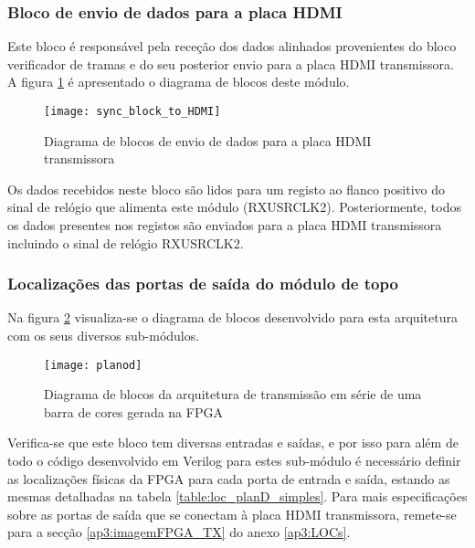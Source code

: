 \subsubsection*{Bloco de envio de dados para a placa HDMI} \label{subsub:serial_send signals to HDMI}

Este bloco é responsável pela receção dos dados alinhados provenientes do bloco verificador de tramas e do seu posterior envio para a placa HDMI transmissora. A figura \ref{fig:sync_block_to_HDMI} é apresentado o diagrama de blocos deste módulo.

\begin{figure}[h!]
	\begin{center}
		\leavevmode
		\texttt{[image: sync\_block\_to\_HDMI]}
		\captionsetup{width=1.0\linewidth}
		\caption[Diagrama de blocos de envio de dados para a placa HDMI transmissora]{Diagrama de blocos de envio de dados para a placa HDMI transmissora}
		\label{fig:sync_block_to_HDMI}
	\end{center}
\end{figure}

Os dados recebidos neste bloco são lidos para um registo ao flanco positivo do sinal de relógio que alimenta este módulo (RXUSRCLK2). Posteriormente, todos os dados presentes nos registos são enviados para a placa HDMI transmissora incluindo o sinal de relógio RXUSRCLK2.

\subsubsection*{Localizações das portas de saída do módulo de topo} \label{subsub:serial_locs_planD}

Na figura \ref{fig:planD} visualiza-se o diagrama de blocos desenvolvido para esta arquitetura com os seus diversos sub-módulos. 
\begin{figure}[h!]
	\begin{center}
		\leavevmode
		\texttt{[image: planod]}
		\captionsetup{width=1.0\linewidth}
		\caption[Diagrama de blocos da arquitetura de transmissão em série de uma barra de cores gerada na FPGA]{Diagrama de blocos da arquitetura de transmissão em série de uma barra de cores gerada na FPGA}
		\label{fig:planD}
	\end{center}
\end{figure}

Verifica-se que este bloco tem diversas entradas e saídas, e por isso para além de todo o código desenvolvido em Verilog para estes sub-módulo é necessário definir as localizações físicas da FPGA para cada porta de entrada e saída, estando as mesmas detalhadas na  tabela \ref{table:loc_planD_simples}. Para mais especificações sobre as portas de saída que se conectam à placa HDMI transmissora, remete-se para a secção \ref{ap3:imagemFPGA_TX} do anexo \ref{ap3:LOCs}.

